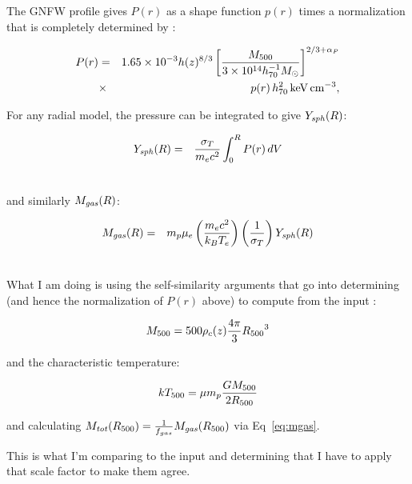 The GNFW profile gives $P(r)$ as a shape function $p(r)$ times a normalization  that is completely determined by :

\begin{eqnarray}
P(r) &=& 1.65\times10^{-3}h(z)^{8/3}\left[{\M500\over{3\times10^{14}h^{-1}_{70}\Msolar}}\right]^{2/3+\alpha_P}\\\nonumber
&\times& p(r) \,h^2_{70}\,{\rm keV\,cm^{-3}},
\end{eqnarray}

For any radial model, the pressure can be integrated to give $Y_{\it sph}(R)$:

\begin{eqnarray}
Y_{\it sph}(R) &=& {{\sigma_T}\over{m_e c^2}}\int^{R}_{0}{P(r)\,dV}\\\nonumber
\end{eqnarray}

and similarly $M_{\it gas}(R)$:

\begin{eqnarray}
M_{\it gas}(R) &=& m_p\mu_e \left({{m_e c^2}\over{k_B T_e}}\right)\left({{1}\over{\sigma_T}}\right)Y_{\it sph}(R)\\\nonumber
\label{eq:mgas}
\end{eqnarray}

What I am doing is using the self-similarity arguments that go into determining  (and hence the normalization of $P(r)$ above) to compute  from the input :

\begin{equation}
\M500 = 500  \rho_c(z) {{4\pi}\over{3}}{\R500}^3
\label{eq:r500}
\end{equation}

and the characteristic temperature:

\begin{equation}
k\T500 = \mu m_p {{G \M500}\over{2\R500}}
\label{eq:t500}
\end{equation}

and calculating $M_{\it tot}(\R500) = {1\over{f_{gas}}}\Mgas(\R500)$ via Eq~\ref{eq:mgas}.  

This is what I'm comparing to the input  and determining that
I have to apply that scale factor to make them agree.


